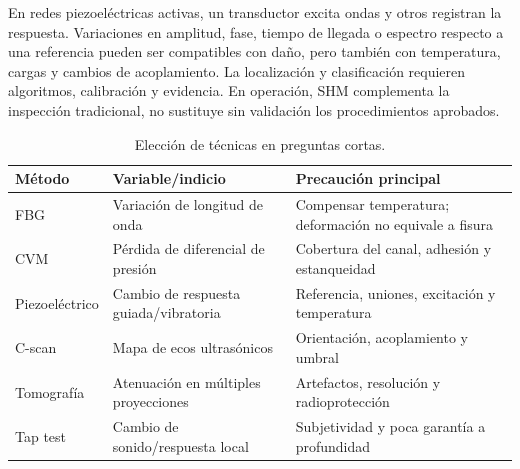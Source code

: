 En redes piezoeléctricas activas, un transductor excita ondas y otros registran la respuesta. Variaciones en amplitud, fase, tiempo de llegada o espectro respecto a una referencia pueden ser compatibles con daño, pero también con temperatura, cargas y cambios de acoplamiento. La localización y clasificación requieren algoritmos, calibración y evidencia. En operación, SHM complementa la inspección tradicional, no sustituye sin validación los procedimientos aprobados.

\begin{table}[htbp]\centering\small
\caption{Elección de técnicas en preguntas cortas.}\label{tab:puente-shm}
\begin{tabular}{p{.19\linewidth}p{.31\linewidth}p{.37\linewidth}}\toprule
Método & Variable/indicio & Precaución principal\\\midrule
FBG & Variación de longitud de onda & Compensar temperatura; deformación no equivale a fisura\\
CVM & Pérdida de diferencial de presión & Cobertura del canal, adhesión y estanqueidad\\
Piezoeléctrico & Cambio de respuesta guiada/vibratoria & Referencia, uniones, excitación y temperatura\\
C-scan & Mapa de ecos ultrasónicos & Orientación, acoplamiento y umbral\\
Tomografía & Atenuación en múltiples proyecciones & Artefactos, resolución y radioprotección\\
Tap test & Cambio de sonido/respuesta local & Subjetividad y poca garantía a profundidad\\\bottomrule
\end{tabular}
\end{table}

